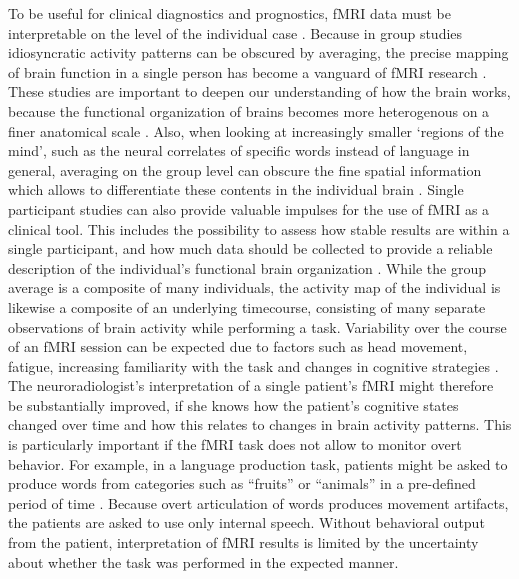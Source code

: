 \documentclass[fleqn,10pt]{SelfArx} %
\begin{document}
To be useful for clinical diagnostics and prognostics, fMRI data must be interpretable on the level of the individual case \citep{Dubois_2016}. Because in group studies idiosyncratic activity patterns can be obscured by averaging, the precise mapping of brain function in a single person has become a vanguard of fMRI research \citep{Laumann_2015, Huth_2016, Gordon_2017}. These studies are important to deepen our understanding of how the brain works, because the functional organization of brains becomes more heterogenous on a finer anatomical scale \citep{Laumann_2015, Poldrack_2017}. Also, when looking at increasingly smaller ‘regions of the mind’, such as the neural correlates of specific words instead of language in general, averaging on the group level can obscure the fine spatial information which allows to differentiate these contents in the individual brain \citep{Huth_2016}. Single participant studies can also provide valuable impulses for the use of fMRI as a clinical tool. This includes the possibility to assess how stable results are within a single participant, and how much data should be collected to provide a reliable description of the individual's functional brain organization \citep{Laumann_2015, Gordon_2017}. While the group average is a composite of many individuals, the activity map of the individual is likewise a composite of an underlying timecourse, consisting of many separate observations of brain activity while performing a task. Variability over the course of an fMRI session can be expected due to factors such as head movement, fatigue, increasing familiarity with the task and changes in cognitive strategies \citep{McGonigle_2012, Gorgolewski_2013}. The neuroradiologist's interpretation of a single patient's fMRI might therefore be substantially improved, if she knows how the patient's cognitive states changed over time and how this relates to changes in brain activity patterns. This is particularly important if the fMRI task does not allow to monitor overt behavior. For example, in a language production task, patients might be asked to produce words from categories such as “fruits” or “animals” in a pre-defined period of time \citep{Woermann_2003}. Because overt articulation of words produces movement artifacts, the patients are asked to use only internal speech. Without behavioral output from the patient, interpretation of fMRI results is limited by the uncertainty about whether the task was performed in the expected manner.
\end{document}
